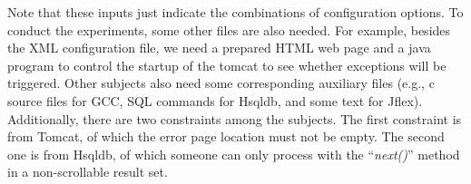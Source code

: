 \documentclass[journal,12pt,onecolumn,draftclsnofoot,]{IEEEtran}
\begin{document}
Note that these inputs just indicate the combinations of configuration options. To conduct the experiments, some other files are also needed. For example, besides the XML configuration file, we need a prepared HTML web page and a java program to control the startup of the tomcat to see whether exceptions will be triggered. Other subjects also need some corresponding auxiliary files (e.g., c source files for GCC, SQL commands for Hsqldb, and some text for Jflex). Additionally, there are two constraints among the subjects. The first constraint is from Tomcat, of which the error page location must not be empty. The second one is from Hsqldb, of which someone  can only process with the ``\emph{next()}'' method in a non-scrollable result set.
%



%
%
%
%
\end{document}
